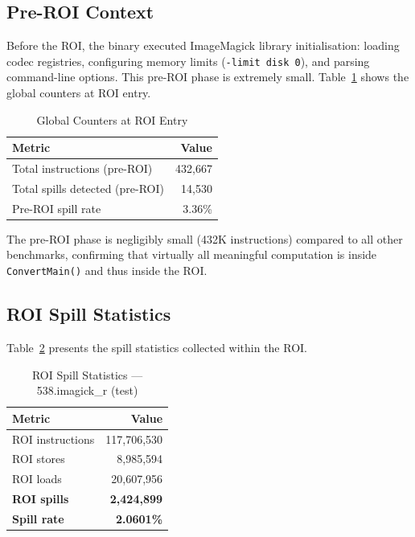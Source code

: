 \documentclass[conference]{IEEEtran}
\begin{document}
\subsection{Pre-ROI Context}

Before the ROI, the binary executed ImageMagick library initialisation:
loading codec registries, configuring memory limits (\texttt{-limit disk 0}),
and parsing command-line options. This pre-ROI phase is extremely small.
Table~\ref{tab:preroi} shows the global counters at ROI entry.

\begin{table}[H]
\centering
\caption{Global Counters at ROI Entry}
\label{tab:preroi}
\begin{tabular}{lr}
\toprule
\textbf{Metric} & \textbf{Value} \\
\midrule
Total instructions (pre-ROI) & 432,667 \\
Total spills detected (pre-ROI) & 14,530 \\
Pre-ROI spill rate & 3.36\% \\
\bottomrule
\end{tabular}
\end{table}

The pre-ROI phase is negligibly small (432K instructions) compared to
all other benchmarks, confirming that virtually all meaningful
computation is inside \texttt{ConvertMain()} and thus inside the ROI.

\subsection{ROI Spill Statistics}

Table~\ref{tab:roi} presents the spill statistics collected within
the ROI.

\begin{table}[H]
\centering
\caption{ROI Spill Statistics --- 538.imagick\_r (test)}
\label{tab:roi}
\begin{tabular}{lr}
\toprule
\textbf{Metric} & \textbf{Value} \\
\midrule
ROI instructions         & 117,706,530 \\
ROI stores               &   8,985,594 \\
ROI loads                &  20,607,956 \\
\midrule
\textbf{ROI spills}      & \textbf{2,424,899} \\
\textbf{Spill rate}      & \textbf{2.0601\%} \\
\bottomrule
\end{tabular}
\end{table}
\end{document}

